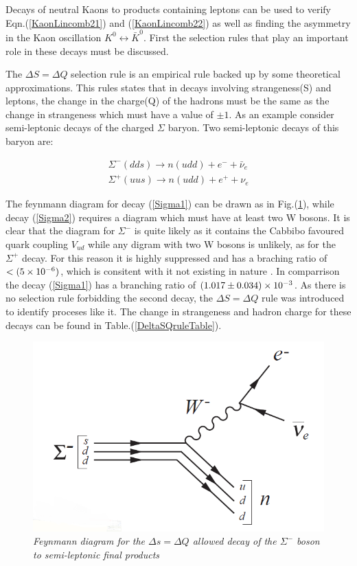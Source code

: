 Decays of neutral Kaons to products containing leptons can be used to verify Eqn.(\ref{KaonLincomb21}) and (\ref{KaonLincomb22}) as well as finding the asymmetry in the Kaon oscillation $K^{0} \leftrightarrow \bar{K}^{0}$. First the selection rules that play an important role in these decays must be discussed.

The $\Delta S = \Delta Q$ selection rule is an empirical rule backed up by some theoretical approximations. This rules states that in decays involving strangeness(S) and leptons, the change in the charge(Q) of the hadrons must be the same as the change in strangeness which must have a value of $\pm 1$. As an example consider semi-leptonic decays of the charged $\Sigma$ baryon. Two semi-leptonic decays of this baryon are:

\begin{align}
\label{Sigma1}
\Sigma^{-} (dds) \rightarrow n(udd) + e^{-} + \bar{\nu}_{e} \\
\label{Sigma2}
\Sigma^{+} (uus) \rightarrow n(udd) + e^{+} + \nu_{e}
\end{align}  

\noindent The feynmann diagram for decay (\ref{Sigma1}) can be drawn as in Fig.(\ref{KevFeyn2}), while decay (\ref{Sigma2}) requires a diagram which must have at least two W bosons. It is clear that the diagram for $\Sigma^{-}$ is quite likely as it contains the Cabbibo favoured quark coupling $V_{ud}$ while any digram with two W bosons is unlikely, as for the $\Sigma^{+}$ decay. For this reason it is highly suppressed and has a braching ratio of $< (5\times 10^{-6})$, which is consitent with it not existing in nature \cite{PDGKaons}. In comparrison the decay (\ref{Sigma1}) has a branching ratio of $(1.017 \pm 0.034) \times 10^{-3}$. As there is no selection rule forbidding the second decay, the $\Delta S = \Delta Q$ rule was introduced to identify proceses like it. The change in strangeness and hadron charge for these decays can be found in Table.(\ref{DeltaSQruleTable}).

\begin{figure}[h!]
\begin{center}
\includegraphics[scale=0.4]{figs/KevFeyn2.png}
\end{center}
\caption{\textit{Feynmann diagram for the $\Delta s = \Delta Q$ allowed decay of the $\Sigma^{-}$ boson to semi-leptonic final products}}
\label{KevFeyn2}
\end{figure}

